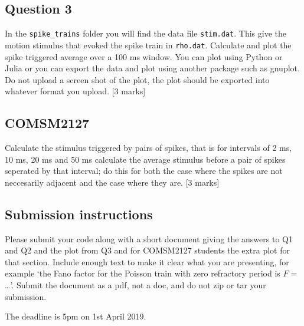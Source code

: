 \documentclass[12pt]{article}
\begin{document}
\subsection*{Question 3} 

In the \texttt{spike\_trains} folder you will find the data file
\texttt{stim.dat}. This give the motion stimulus that evoked the spike
train in \texttt{rho.dat}. Calculate and plot the spike triggered
average over a 100 ms window. You can plot using Python or Julia or
you can export the data and plot using another package such as
gnuplot. Do not upload a screen shot of the plot, the plot should be
exported into whatever format you upload. [3 marks]

\subsection*{COMSM2127}

Calculate the stimulus triggered by pairs of spikes, that is for
intervals of 2 ms, 10 ms, 20 ms and 50 ms calculate the average
stimulus before a pair of spikes seperated by that interval; do this
for both the case where the spikes are not neccesarily adjacent and
the case where they are. [3 marks]

\subsection*{Submission instructions}

Please submit your code along with a short document giving the answers
to Q1 and Q2 and the plot from Q3 and for COMSM2127 students the extra
plot for that section. Include enough text to make it clear what you
are presenting, for example \lq{}the Fano factor for the Poisson train
with zero refractory period is $F=$\ldots\rq{}. Submit the document as
a pdf, not a doc, and do not zip or tar your submission.

The deadline is 5pm on 1st April 2019.
\end{document}
